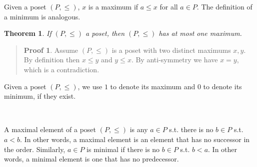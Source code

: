 \documentclass[a4paper, 12pt]{article}
\newtheorem{theorem}{Theorem}
\theoremstyle{definition}
\theoremstyle{definition}
\theoremstyle{definition}
\newtheorem{pro}{Proof}
\begin{document}
Given a poset $(P, \leq)$, $x$ is a maximum if $a \leq x$ for all $a \in P$. The
definition of a minimum is analogous.  

\begin{theorem}
    If $(P, \leq)$ a poset, then $(P, \leq) $ has at most one maximum.
\end{theorem}


\small
\begin{quote}

    \begin{pro}
         Assume $(P, \leq) $ is a poset with two distinct maximums $x, y$. By
         definition then $x \leq y$ and $y \leq x$. By anti-symmetry we have $x
         = y$, which is a contradiction.
    \end{pro}

\end{quote}
\normalsize

Given a poset $(P, \leq) $, we use $1$ to denote its maximum and $0$ to denote
its minimum, if they exist. 

~ 

A maximal element of a poset $(P, \leq) $ is any $a \in P$ s.t. there is no $b
\in P$ s.t. $a < b$. In other words, a maximal element is an element that has no
successor in the order. Similarly, $a \in P$ is minimal if there is no $b \in P$
s.t. $b < a$. In other words, a minimal element is one that has no predecessor.
\end{document}
